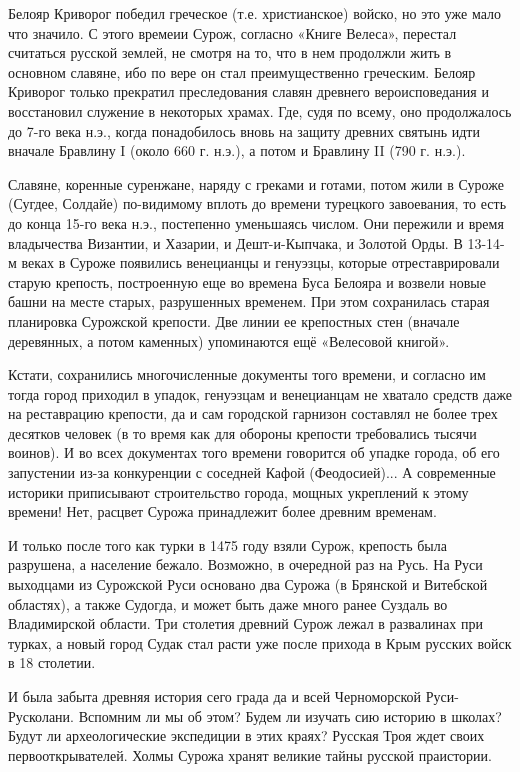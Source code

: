 Белояр Криворог победил греческое (т.е. христианское) войско, но это уже мало
что значило. С этого времеии Сурож, согласно «Книге Велеса», перестал считаться
русской землей, не смотря на то, что в нем продолжли жить в основном славяне,
ибо по вере он стал преимущественно греческим. Белояр Криворог только прекратил
преследования славян древнего вероис­поведания и восстановил служение в
некоторых храмах. Где, судя по всему, оно продолжалось до 7-го века н.э., когда
понадобилось вновь на защиту древних святынь идти вначале Бравлину I (около 660
г. н.э.), а потом и Бравлину II (790 г. н.э.).

Славяне, коренные суренжане, наряду с греками и готами, потом жили в Суроже
(Сугдее, Солдайе) по-видимому вплоть до времени турецкого заво­евания, то есть
до конца 15-го века н.э., постепенно уменьшаясь числом. Они пережили и время
владычества Византии, и Хазарии, и Дешт-и-Кыпчака, и Золотой Орды. В 13-14-м
веках в Суроже появились венецианцы и генуэзцы, которые отреставрировали старую
крепость, построенную еще во времена Буса Белояра и возвели новые башни на
месте старых, разрушенных временем. При этом сохранилась старая планировка
Сурожской крепости. Две линии ее крепостных стен (вначале деревянных, а потом
каменных) упоминаются ещё «Велесовой книгой».

Кстати, сохранились многочисленные документы того времени, и со­гласно им тогда
город приходил в упадок, генуэзцам и венецианцам не хватало средств даже на
реставрацию крепости, да и сам городской гарнизон составлял не более трех
десятков человек (в то время как для обороны крепости требовались тысячи
воинов). И во всех документах того времени говорится об упадке города, об его
запустении из-за конкуренции с соседней Кафой (Феодосией)... А современные
историки приписывают строительство города, мощных укреплений к этому времени!
Нет, расцвет Сурожа принадлежит более древним временам.

И только после того как турки в 1475 году взяли Сурож, крепость была разрушена,
а население бежало. Возможно, в очередной раз на Русь. На Руси выходцами из
Сурожской Руси основано два Сурожа (в Брянской и Витебской областях), а также
Судогда, и может быть даже много ранее Суздаль во Владимирской области. Три
столетия древний Сурож лежал в развалинах при турках, а новый город Судак стал
расти уже после прихода в Крым русских войск в 18 столетии.

И была забыта древняя история сего града да и всей Черноморской Руси-Русколани.
Вспомним ли мы об этом? Будем ли изучать сию историю в школах? Будут ли
археологические экспедиции в этих краях? Русская Троя ждет своих
первооткрывателей. Холмы Сурожа хранят великие тайны русской праистории.

